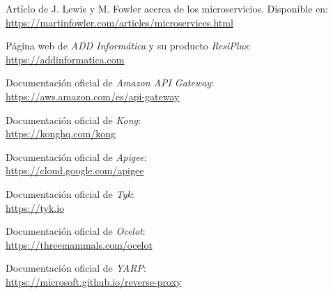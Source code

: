 \documentclass[11pt,spanish,listoffigures]{tfgetsinf}
\begin{document}
\begin{thebibliography}{10}

	Artíclo de J. Lewis y M. Fowler acerca de los microservicios.
	\newblock Disponible en:\\
	\url{https://martinfowler.com/articles/microservices.html}

	Página web de \emph{ADD Informática} y su producto \emph{ResiPlus}:\\
	\url{https://addinformatica.com}

	Documentación oficial de \emph{Amazon API Gateway}:\\
	\url{https://aws.amazon.com/es/api-gateway}
	
	Documentación oficial de \emph{Kong}:\\
	\url{https://konghq.com/kong}
	
	Documentación oficial de \emph{Apigee}:\\
	\url{https://cloud.google.com/apigee}
	
	Documentación oficial de \emph{Tyk}:\\
	\url{https://tyk.io}

	Documentación oficial de \emph{Ocelot}:\\
	\url{https://threemammals.com/ocelot}

	Documentación oficial de \emph{YARP}:\\
	\url{https://microsoft.github.io/reverse-proxy}

\end{thebibliography}
\end{document}
